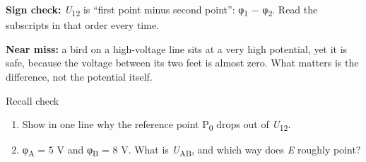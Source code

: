 \documentclass[11pt]{article}
\begin{document}
\begin{keepsection}
\begin{notebox}\textbf{Sign check:} \textit{U}\textsubscript{12} is “first point minus second point”: φ\textsubscript{1} \ensuremath{-} φ\textsubscript{2}. Read the subscripts in that order every time.\end{notebox}

\begin{notebox}\textbf{Near miss:} a bird on a high-voltage line sits at a very high potential, yet it is safe, because the voltage between its two feet is almost zero. What matters is the difference, not the potential itself.\end{notebox}

\begin{recallbox}{Recall check}
\begin{enumerate}
\item Show in one line why the reference point P\textsubscript{0} drops out of \textit{U}\textsubscript{12}.
\item φ\textsubscript{A} = 5 V and φ\textsubscript{B} = 8 V. What is \textit{U}\textsubscript{AB}, and which way does \textit{E} roughly point?
\end{enumerate}

\end{recallbox}
\end{keepsection}
\end{document}
